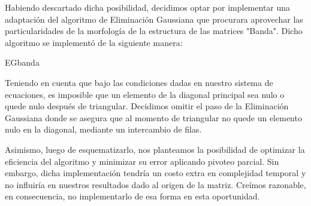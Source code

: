 \documentclass[double, 1.5in, 12pt]{beavtex}
\begin{document}
Habiendo descartado dicha posibilidad, decidimos optar por implementar una adaptaci\'on del algoritmo de Eliminaci\'on Gaussiana que procurara aprovechar las particularidades de la morfolog\'ia de la estructura de las matrices "Banda". 
Dicho algoritmo se implement\'o de la siguiente manera:


\IncMargin{1em}
\begin{algorithm}
\BlankLine
{}
\caption{EGbanda}\label{algo_disjdecomp}
\end{algorithm}\DecMargin{1em}


Teniendo en cuenta que bajo las condiciones dadas en nuestro sistema de ecuaciones, es imposible que un elemento de la diagonal principal sea nulo o quede nulo despu\'es de triangular. Decidimos omitir el paso de la Eliminaci\'on Gaussiana donde se  asegura que al momento de triangular no quede un elemento nulo en la diagonal, mediante un intercambio de filas.

Asimismo, luego de esquematizarlo, nos planteamos la posibilidad de optimizar la eficiencia del algoritmo y minimizar su error aplicando pivoteo parcial. Sin embargo, dicha implementaci\'on tendr\'ia un costo extra en complejidad temporal y no influir\'ia en nuestros resultados dado al origen de la matriz. Cre\'imos razonable, en consecuencia, no implementarlo de esa forma en esta oportunidad.\\
\end{document}
